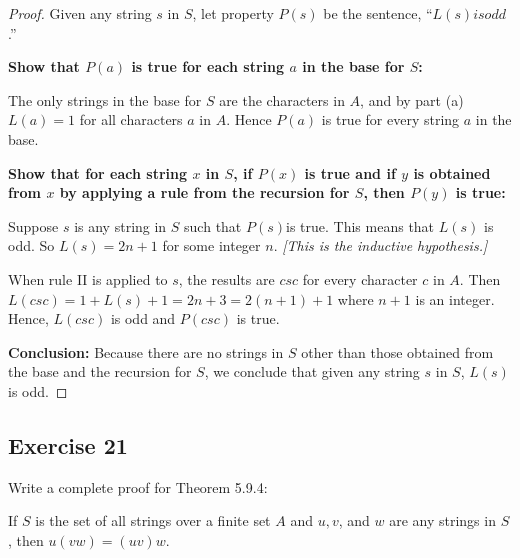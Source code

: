 \documentclass[14pt]{extarticle}
\begin{document}
\begin{proof}
    Given any string $s$ in $S$, let property $P(s)$ be the sentence, “$L(s) is odd$.”

    {\bf Show that $P(a)$ is true for each string $a$ in the base for $S$:}

    The only strings in the base for $S$ are the characters in $A$, and by part (a) $L(a) = 1$ for all characters $a$ in
    $A$. Hence $P(a)$ is true for every string $a$ in the base.

        {\bf Show that for each string $x$ in $S$, if $P(x)$ is true and if $y$ is obtained from $x$ by applying a rule
            from the recursion for $S$, then $P(y)$ is true:}

    Suppose $s$ is any string in $S$ such that $P(s)$is true. This means that $L(s)$ is odd. So $L(s) = 2n+1$ for some
    integer $n$. {\it [This is the inductive hypothesis.]}

    When rule II is applied to $s$, the results are $csc$ for every character $c$ in $A$. Then
    \(L(csc) = 1 + L(s) + 1 = 2n+3 = 2(n+1) + 1\) where $n+1$ is an integer. Hence, $L(csc)$ is odd and $P(csc)$ is true.

        {\bf Conclusion:} Because there are no strings in $S$ other than those obtained from the base and the recursion for
    $S$, we conclude that given any string $s$ in $S$, \(L(s)\) is odd.
\end{proof}

\subsection{Exercise 21}
Write a complete proof for Theorem 5.9.4:

If $S$ is the set of all strings over a finite set $A$ and $u, v$, and $w$ are any strings in $S$, then \(u(vw) = (uv)w\).
\end{document}
